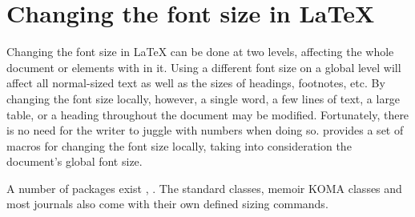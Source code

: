 \begin{comment}
\setromanfont{Times New Roman}

\subsection{A CJK environment}

\newenvironment{CJK}{\fontspec[Scale=0.9]{SimSun}}{}

\newcommand{\cjk}[1]{{\fontspec[Scale=0.9]{SimSun}#1}}

Rather than selecting a CJK font as the main document typeface, you might want to define a CJK environment for text fragments used in the midst of a document using a normal Roman font. This allows me to say \verb|\begin{CJK}東光\end{CJK}| to generate \begin{CJK}東光\end{CJK}, without putting the whole paragraph into the Far Eastern font. Or I could define a command that takes the CJK text as an argument, so that \verb|\cjk{北京}| produces \cjk{北京}. It's that easy! Such an environment can easily be set using the \cmd{newfamily} or \cmd{\fontspec}.

\begin{verbatim}
\newenvironment{CJK}{\fontspec[Scale=0.9]{SimSun}}{}
\newcommand{\cjk}[1]{{\fontspec[Scale=0.9]{SimSun}#1}}
\end{verbatim}
\end{comment}


\normalfont

\section{Changing the font size in LaTeX}


Changing the font size in LaTeX can be done at two levels, 
affecting the whole document or elements with in it. 
Using a different font size on a
global level will affect all normal-sized text as well
as the sizes of headings, footnotes, etc. By changing
the font size locally, however, a single word, a few
lines of text, a large table, or a heading throughout
the document may be modified. Fortunately, there is
no need for the writer to juggle with numbers when
doing so. \latex provides a set of macros for changing
the font size locally, taking into consideration the
document’s global font size. \citep{thurnherr2012}

A number of packages exist  \citep{moresize},
  \citep{anyfont}. The standard classes, memoir
 KOMA classes and most journals also come with their own
 defined sizing commands.
 
 
















